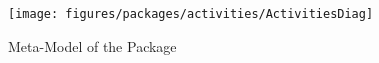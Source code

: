%
%

\begin{figure}[htbp]
  \centering
  \texttt{[image: figures/packages/activities/ActivitiesDiag]}
  \caption{Meta-Model of the  Package}
  \label{fig:MM:activities}
\end{figure}
